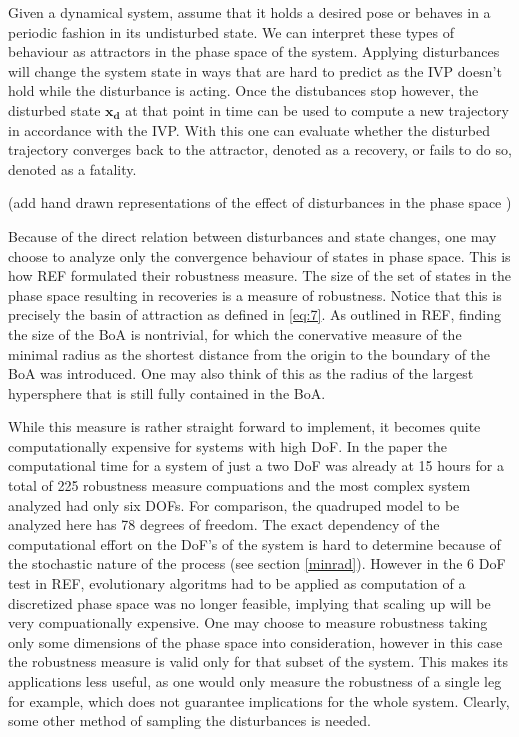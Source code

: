     Given a dynamical system, assume that it holds a desired pose or behaves in a periodic fashion in its undisturbed state. We can interpret these types of behaviour as attractors in the phase space of the system. Applying disturbances will change the system state in ways that are hard to predict as the IVP doesn't hold while the disturbance is acting. Once the distubances stop however, the disturbed state $\mathbf{x_d}$ at that point in time can be used to compute a new trajectory in accordance with the IVP. With this one can evaluate whether the disturbed trajectory converges back to the attractor, denoted as a recovery, or fails to do so, denoted as a fatality. %

    (add hand drawn representations of the effect of disturbances in the phase space )

    Because of the direct relation between disturbances and state changes, one may choose to analyze only the convergence behaviour of states in phase space. This is how REF formulated their robustness measure. The size of the set of states in the phase space resulting in recoveries is a measure of robustness. Notice that this is precisely the basin of attraction as defined in \ref{eq:7}. As outlined in REF, finding the size of the BoA is nontrivial, for which the conervative measure of the minimal radius as the shortest distance from the origin to the boundary of the BoA was introduced. One may also think of this as the radius of the largest hypersphere that is still fully contained in the BoA.

    While this measure is rather straight forward to implement, it becomes quite computationally expensive for systems with high DoF. 
    In the paper the computational time for a system of just a two DoF was already at 15 hours for a total of 225 robustness measure compuations and the most complex system analyzed had only six DOFs. For comparison, the quadruped model to be analyzed here has 78 degrees of freedom. The exact dependency of the computational effort on the DoF's of the system is hard to determine because of the stochastic nature of the process (see section \ref{minrad}). However in the 6 DoF test in REF, evolutionary algoritms had to be applied as computation of a discretized phase space was no longer feasible, implying that scaling up will be very compuationally expensive. One may choose to measure robustness taking only some dimensions of the phase space into consideration, however in this case the robustness measure is valid only for that subset of the system. This makes its applications less useful, as one would only measure the robustness of a single leg for example, which does not guarantee implications for the whole system. Clearly, some other method of sampling the disturbances is needed.

